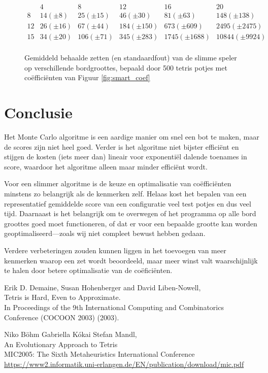 \documentclass[10pt]{article}
\begin{document}
\begin{figure}
$$\begin{array}{l||c|c|c|c|c}
	    & 4 			& 8 			   & 12 			& 16 			 & 20 \\ 
	\hline\hline
	8  & 14 (\pm 8) 	& 25 (\pm 15) & 46 (\pm 30)  & 81 (\pm 63)  & 148 (\pm 138) \\
	12 & 26 (\pm 16) & 67 (\pm 44)    & 184 (\pm 150)     & 673 (\pm 609) & 2495 (\pm 2475)  \\
	15 & 34 (\pm 20) & 106 (\pm 71) & 345 (\pm 283)     & 1745 (\pm 1688) & 10844 (\pm 9924) \\
\end{array}$$
\caption{Gemiddeld behaalde zetten (en standaardfout) van de slimme speler op verschillende bordgroottes, bepaald door 500 tetris potjes met co\"effici\"enten van Figuur \ref{fig:smart_coef}}\label{fig:smart_bord}
\end{figure}

\section{Conclusie}

Het Monte Carlo algoritme is een aardige manier om snel een bot te maken, maar de scores zijn niet heel goed. Verder is het algoritme niet bijster effici\"ent en stijgen de kosten (iets meer dan) lineair voor exponenti\"el dalende toenames in score, waardoor het algoritme alleen maar minder effici\"ent wordt.

Voor een slimmer algoritme is de keuze en optimalisatie van co\"effici\"enten minstens zo belangrijk als de kenmerken zelf. Helaas kost het bepalen van een representatief gemiddelde score van een configuratie veel test potjes en dus veel tijd. Daarnaast is het belangrijk om te overwegen of het programma op alle bord groottes goed moet functioneren, of dat er voor een bepaalde grootte kan worden geoptimaliseerd---zoals wij niet compleet bewust hebben gedaan.

Verdere verbeteringen zouden kunnen liggen in het toevoegen van meer kenmerken waarop een zet wordt beoordeeld, maar meer winst valt waarschijnlijk te halen door betere optimalisatie van de co\"efici\"enten. 

\begin{thebibliography}{XX}

Erik D. Demaine, Susan Hohenberger and David Liben-Nowell, \\
Tetris is Hard, Even to Approximate. \\
In Proceedings of the 9th International Computing and Combinatorics Conference (COCOON 2003) (2003).

Niko B\"{o}hm Gabriella K\'{o}kai Stefan Mandl, \\
An Evolutionary Approach to Tetris \\
MIC2005: The Sixth Metaheuristics International Conference \\
\url{https://www2.informatik.uni-erlangen.de/EN/publication/download/mic.pdf}

\end{thebibliography}
\end{document}
